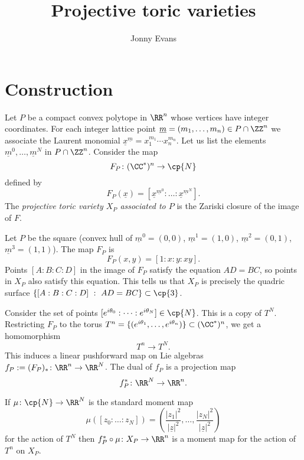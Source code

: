 \documentclass{article}
\title{Projective toric varieties}
\author{Jonny Evans}
\begin{document}
\section{Construction}

Let $P$ be a compact convex polytope in $\RR^n$ whose vertices have integer coordinates. For each integer lattice point $\underline{m}=(m_1,\ldots,m_n)\in P\cap\ZZ^n$ we associate the Laurent monomial $\underline{x}^{\underline{m}}=x_1^{m_1}\cdots x_n^{m_n}$. Let us list the elements $\underline{m}^0,\ldots,\underline{m}^N$ in $P\cap\ZZ^n$. Consider the map
\[F_P\colon(\CC^*)^n\to\cp{N}\]
defined by
\[F_P(\underline{x})=[\underline{x}^{\underline{m}^0}:\ldots:\underline{x}^{\underline{m}^N}].\]
The {\em projective toric variety $X_P$ associated to $P$} is the Zariski closure of the image of $F$.

\begin{Example}
  Let $P$ be the square (convex hull of $\underline{m}^0=(0,0)$, $\underline{m}^1=(1,0)$, $\underline{m}^2=(0,1)$, $\underline{m}^3=(1,1)$). The map $F_P$ is
  \[F_P(x,y)=[1:x:y:xy].\]
  Points $[A:B:C:D]$ in the image of $F_P$ satisfy the equation $AD=BC$, so points in $X_P$ also satisfy this equation. This tells us that $X_P$ is precisely the quadric surface $\{[A:B:C:D]\ :\ AD=BC\}\subset\cp{3}$.
\end{Example}

Consider the set of points $[e^{i\theta_0}:\cdots:e^{i\theta_N}]\in\cp{N}$. This is a copy of $T^N$. Restricting $F_P$ to the torus $T^n=\{(e^{i\theta_1},\ldots,e^{i\theta_n})\}\subset(\CC^*)^n$, we get a homomorphism
\[T^n\to T^N.\]
This induces a linear pushforward map on Lie algebras $f_P:=(F_P)_*\colon\RR^n\to\RR^N$. The dual of $f_P$ is a projection map
\[f_P^*\colon\RR^N\to\RR^n.\]

\begin{Theorem}
  If $\mu\colon\cp{N}\to\RR^N$ is the standard moment map
  \[\mu([z_0:\ldots:z_N])=\left(\frac{|z_1|^2}{|\underline{z}|^2},\ldots,\frac{|z_N|^2}{|\underline{z}|^2}\right)\]
  for the action of $T^N$ then $f_P^*\circ\mu\colon X_P\to\RR^n$ is a moment map for the action of $T^n$ on $X_P$.
\end{Theorem}
\end{document}
